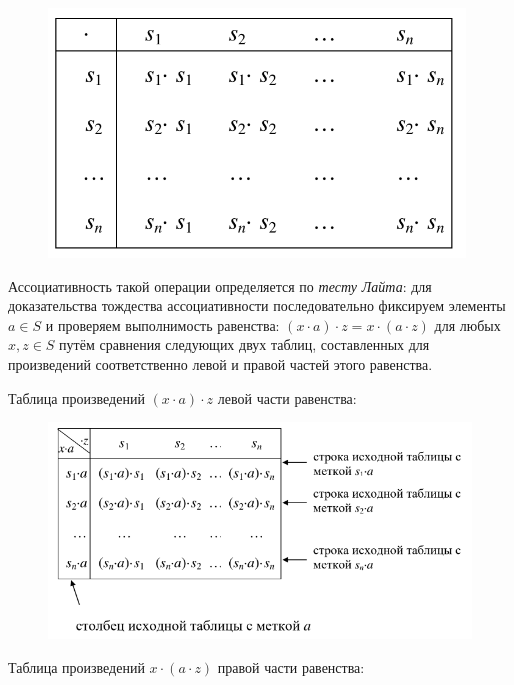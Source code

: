 \documentclass[spec, och, otchet, hidelinks]{SCWorks}
\begin{document}
\begin{figure}[h]
  \center\includegraphics[scale=0.6]{cayley_table.png}
\end{figure}

\par Ассоциативность такой операции определяется по \textit{тесту Лайта}: для
доказательства тождества ассоциативности последовательно фиксируем элементы $a
\in S$ и проверяем выполнимость равенства: $(x \cdot a) \cdot z = x \cdot (a
\cdot z)$ для любых $x, z \in S$ путём сравнения следующих двух таблиц,
составленных для произведений соответственно левой и правой частей этого
равенства.

\newpage

\par Таблица произведений $(x \cdot a) \cdot z$ левой части равенства:

\begin{figure}[h]
  \center\includegraphics[scale=0.5]{left_cayley.png}
\end{figure}

\par Таблица произведений $x \cdot (a \cdot z)$ правой части равенства:
\end{document}
